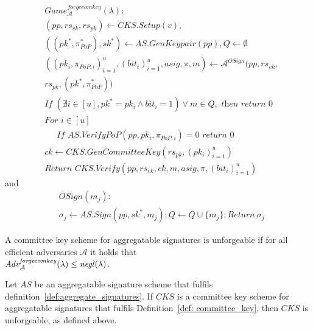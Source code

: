 \begin{align*}
&\mathit{Game}^{\mathit{forgecomkey}}_{\mathcal{A}}({\lambda}): \\
& (\mathit{pp}, \mathit{rs}_{\mathit{vk}},\mathit{rs}_{\mathit{pk}}) \leftarrow \mathit{CKS.Setup}(v), \\
&((\mathit{pk}^*,\pi^*_{\mathit{PoP}}), \mathit{sk}^*) \leftarrow \mathit{AS.GenKeypair}(\mathit{pp}), Q \leftarrow \emptyset \\
& ((\mathit{pk_i}, \pi_{\mathit{PoP},i})_{i=1}^{u}, (\mathit{bit_i})_{i=1}^u, \mathit{asig}, \pi, m) \leftarrow \mathcal{A}^{\mathit{OSign}}(\mathit{pp},\mathit{rs}_{\mathit{vk}}, \\ &\mathit{rs}_{\mathit{pk}}, (\mathit{pk^*},\pi^*_{\mathit{PoP}})) \\
&\textit{If } (\nexists i  \in [u], \mathit{pk}^* = \mathit{pk_i} \wedge \mathit{bit_i}=1) \vee m \in Q, \textit{ then return } 0 \\
& \textit{For } i \in [u] \\
& \ \ \ \ \ \textit{ If } \mathit{AS.VerifyPoP}(\mathit{pp}, \mathit{pk_i}, \pi_{\mathit{PoP,i}})=0  \textit{ return } 0 \\
& \mathit{ck} \leftarrow \mathit{CKS.GenCommitteeKey}(\mathit{rs}_{\mathit{pk}}, (\mathit{pk_i})_{i=1}^u) \\
& \textit{Return } \mathit{CKS.Verify}(\mathit{pp}, \mathit{rs}_{\mathit{vk}},  \mathit{ck}, m, \mathit{asig}, \pi, (\mathit{bit_i})_{i=1}^u)
\end{align*}
and 
\begin{align*}
& \mathit{OSign}(m_j): \\
& \sigma_j \leftarrow \mathit{AS.Sign}(\mathit{pp}, \mathit{sk}^*, m_j); Q \leftarrow Q \cup \{m_j\}; \textit{Return} \ \sigma_j
\end{align*}

\noindent A committee key scheme for aggregatable signatures is unforgeable if for all efficient adversaries $\mathcal{A}$ it holds that \\ 
$\mathit{Adv}_{\mathcal{A}}^{\mathit{forgecomkey}}(\lambda) \leq \mathit{negl}(\lambda)$.
\begin{corollary} Let $\mathit{AS}$ be an aggregatable signature scheme that fulfils  
definition~\ref{def:aggregate_signatures}. If $\mathit{CKS}$ is a committee key scheme for aggregatable signatures that fulfils Definition~\ref{def: committee_key}, 
then $\mathit{CKS}$ is unforgeable, as defined above.  
\end{corollary}

